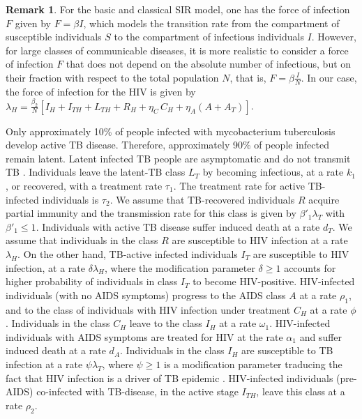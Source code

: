 \documentclass{my_aims}
\theoremstyle{definition}
\newtheorem{remark}{Remark}
\begin{document}
\begin{remark}
For the basic and classical SIR model, one has the force of infection
$F$ given by $F = \beta I$, which models the transition rate from
the compartment of susceptible individuals $S$
to the compartment of infectious individuals $I$.
However, for large classes of communicable diseases,
it is more realistic to consider a force of infection $F$
that does not depend on the absolute number of infectious,
but on their fraction with respect to the total population $N$,
that is, $F = \beta \frac{I}{N}$. In our case, the force of infection
for the HIV is given by
$\lambda_H = \frac{\beta_2}{N} \left[ I_H + I_{TH} + L_{TH}
+ R_{H} + \eta_C \, C_H  + \eta_A \left(A + A_T\right) \right]$.
\end{remark}

Only approximately 10\% of people infected
with mycobacterium tuberculosis develop active TB disease. Therefore,
approximately 90\% of people infected remain latent. Latent infected TB people
are asymptomatic and do not transmit TB \cite{Styblo_1978}.
Individuals leave the latent-TB class $L_T$ by becoming infectious,
at a rate $k_1$, or recovered, with a treatment rate $\tau_1$.
The treatment rate for active TB-infected individuals is $\tau_2$.
We assume that TB-recovered individuals $R$ acquire partial immunity
and the transmission rate for this class is given by $\beta'_1 \lambda_T$
with $\beta'_1 \leq 1$. Individuals with active TB disease suffer
induced death at a rate $d_T$. We assume that individuals in the class
$R$ are susceptible to HIV infection at a rate $\lambda_H$.
On the other hand, TB-active infected individuals $I_T$ are susceptible
to HIV infection, at a rate $\delta \lambda_H$, where the modification
parameter $\delta \geq 1$ accounts for higher probability of individuals
in class $I_T$ to become HIV-positive.
HIV-infected individuals (with no AIDS symptoms) progress to the AIDS class $A$
at a rate $\rho_1$, and to the class of individuals with HIV infection under
treatment $C_H$ at a rate $\phi$. Individuals in the class $C_H$ leave
to the class $I_H$ at a rate $\omega_1$. HIV-infected individuals
with AIDS symptoms are treated for HIV at the rate $\alpha_1$
and suffer induced death at a rate $d_A$. Individuals in the class
$I_H$ are susceptible to TB infection at a rate $\psi \lambda_T$,
where $\psi \geq 1$ is a modification parameter
traducing the fact that HIV infection is a driver of TB epidemic
\cite{Kwan_Ernst_HIV_TB_Syndemic}.
HIV-infected individuals (pre-AIDS) co-infected with TB-disease,
in the active stage $I_{TH}$, leave this class at a rate $\rho_2$.
\end{document}
